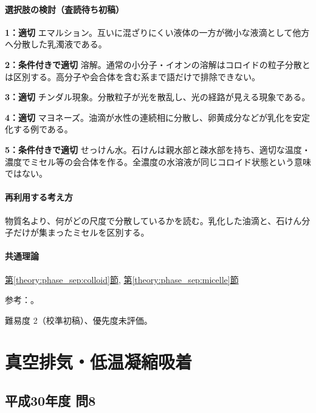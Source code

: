 \paragraph{選択肢の検討（査読待ち初稿）}\mbox{}\par

\noindent\textbf{1：適切} エマルション。互いに混ざりにくい液体の一方が微小な液滴として他方へ分散した乳濁液である。\par

\noindent\textbf{2：条件付きで適切} 溶解。通常の小分子・イオンの溶解はコロイドの粒子分散とは区別する。高分子や会合体を含む系まで語だけで排除できない。\par

\noindent\textbf{3：適切} チンダル現象。分散粒子が光を散乱し、光の経路が見える現象である。\par

\noindent\textbf{4：適切} マヨネーズ。油滴が水性の連続相に分散し、卵黄成分などが乳化を安定化する例である。\par

\noindent\textbf{5：条件付きで適切} せっけん水。石けんは親水部と疎水部を持ち、適切な温度・濃度でミセル等の会合体を作る。全濃度の水溶液が同じコロイド状態という意味ではない。\par

\paragraph{再利用する考え方} 物質名より、何がどの尺度で分散しているかを読む。乳化した油滴と、石けん分子だけが集まったミセルを区別する。

\paragraph{共通理論} \hyperref[theory:phase_sep:colloid]{第\ref*{theory:phase_sep:colloid}節}, \hyperref[theory:phase_sep:micelle]{第\ref*{theory:phase_sep:micelle}節}

\par 参考：\cite{openstax_colloids}。

\par 難易度 2（校準初稿）、優先度未評価。

\section{真空排気・低温凝縮吸着}

\subsection{平成30年度 問8}
\label{q:h30-reg-applied-08}

